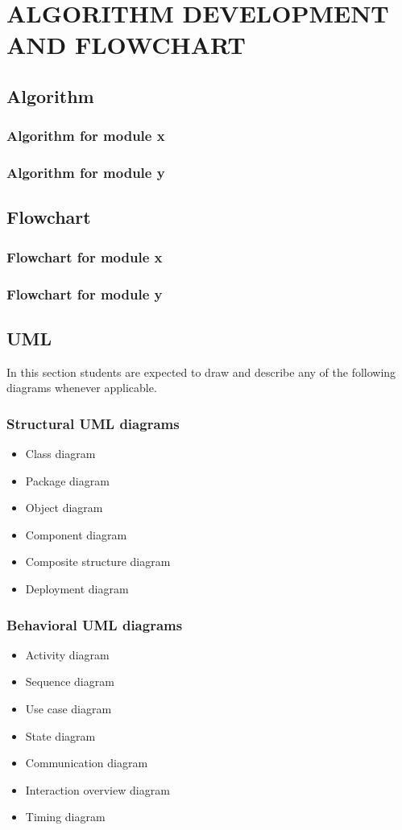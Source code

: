 \documentclass[main]{subfiles}
\begin{document}
\chapter{ALGORITHM DEVELOPMENT AND FLOWCHART}
\section{Algorithm}
	\subsection{Algorithm for module x}
	\subsection{Algorithm for module y}

\section{Flowchart}
	\subsection{Flowchart for module x}
	\subsection{Flowchart for module y}

\section{UML}
In this section students are expected to draw and describe any of the following diagrams whenever applicable.
	\subsection{Structural UML diagrams}
	\begin{itemize}
		\item Class diagram
		\item Package diagram
		\item Object diagram
		\item Component diagram
		\item Composite structure diagram
		\item Deployment diagram
	\end{itemize}

	\subsection{Behavioral UML diagrams}
	\begin{itemize}
		\item Activity diagram
		\item Sequence diagram
		\item Use case diagram
		\item State diagram
		\item Communication diagram
		\item Interaction overview diagram
		\item Timing diagram
	\end{itemize}
\end{document}

